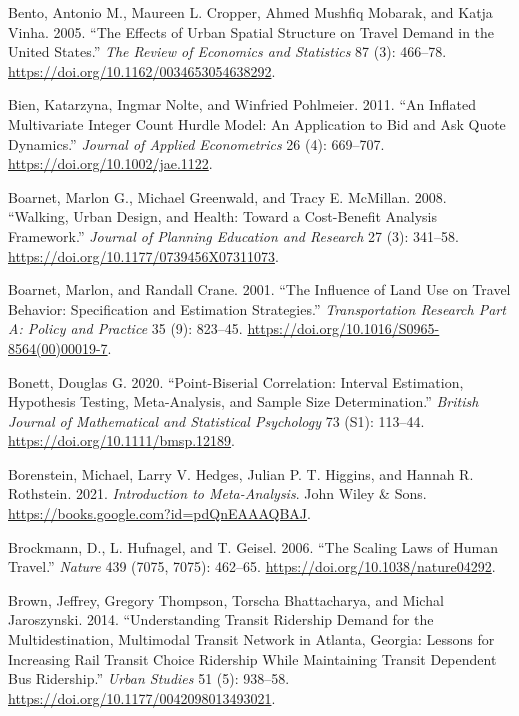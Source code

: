 \documentclass[
  11pt,
  openany]{memoir}
\newlength{\cslhangindent}
\newlength{\cslentryspacingunit} %
\newenvironment{CSLReferences}[2] %
 {%
  \setlength{\parindent}{0pt}
  \ifodd #1
  \let\oldpar\par
  \def\par{\hangindent=\cslhangindent\oldpar}
  \fi
  \setlength{\parskip}{#2\cslentryspacingunit}
 }%
 {}
\begin{document}
\begin{CSLReferences}{1}{0}
\leavevmode{}%
Bento, Antonio M., Maureen L. Cropper, Ahmed Mushfiq Mobarak, and Katja Vinha. 2005. {``The {Effects} of {Urban Spatial Structure} on {Travel Demand} in the {United States}.''} \emph{The Review of Economics and Statistics} 87 (3): 466--78. \url{https://doi.org/10.1162/0034653054638292}.

\leavevmode{}%
Bien, Katarzyna, Ingmar Nolte, and Winfried Pohlmeier. 2011. {``An Inflated Multivariate Integer Count Hurdle Model: An Application to Bid and Ask Quote Dynamics.''} \emph{Journal of Applied Econometrics} 26 (4): 669--707. \url{https://doi.org/10.1002/jae.1122}.

\leavevmode{}%
Boarnet, Marlon G., Michael Greenwald, and Tracy E. McMillan. 2008. {``Walking, {Urban Design}, and {Health}: Toward a {Cost}-{Benefit Analysis Framework}.''} \emph{Journal of Planning Education and Research} 27 (3): 341--58. \url{https://doi.org/10.1177/0739456X07311073}.

\leavevmode{}%
Boarnet, Marlon, and Randall Crane. 2001. {``The Influence of Land Use on Travel Behavior: Specification and Estimation Strategies.''} \emph{Transportation Research Part A: Policy and Practice} 35 (9): 823--45. \url{https://doi.org/10.1016/S0965-8564(00)00019-7}.

\leavevmode{}%
Bonett, Douglas G. 2020. {``Point-Biserial Correlation: Interval Estimation, Hypothesis Testing, Meta-Analysis, and Sample Size Determination.''} \emph{British Journal of Mathematical and Statistical Psychology} 73 (S1): 113--44. \url{https://doi.org/10.1111/bmsp.12189}.

\leavevmode{}%
Borenstein, Michael, Larry V. Hedges, Julian P. T. Higgins, and Hannah R. Rothstein. 2021. \emph{Introduction to {Meta}-{Analysis}}. {John Wiley \& Sons}. \url{https://books.google.com?id=pdQnEAAAQBAJ}.

\leavevmode{}%
Brockmann, D., L. Hufnagel, and T. Geisel. 2006. {``The Scaling Laws of Human Travel.''} \emph{Nature} 439 (7075, 7075): 462--65. \url{https://doi.org/10.1038/nature04292}.

\leavevmode{}%
Brown, Jeffrey, Gregory Thompson, Torscha Bhattacharya, and Michal Jaroszynski. 2014. {``Understanding {Transit Ridership Demand} for the {Multidestination}, {Multimodal Transit Network} in {Atlanta}, {Georgia}: Lessons for {Increasing Rail Transit Choice Ridership} While {Maintaining Transit Dependent Bus Ridership}.''} \emph{Urban Studies} 51 (5): 938--58. \url{https://doi.org/10.1177/0042098013493021}.


\end{CSLReferences}
\end{document}
